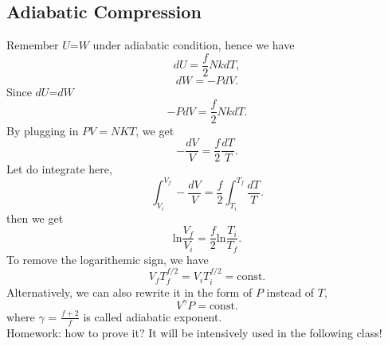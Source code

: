 \documentclass[twoside]{article}
\begin{document}
\subsection{Adiabatic Compression}
Remember $U$=$W$ under adiabatic condition, hence we have 
\begin{equation} \label{du} dU = \frac{f}{2}NkdT, \end{equation}
\begin{equation} \label{dW} dW = -PdV. \end{equation}
Since $dU$=$dW$
\begin{equation} \label{duw1} -PdV = \frac{f}{2}NkdT. \end{equation}
By plugging in $PV = NKT$, we get
\begin{equation} \label{duw2} -\frac{dV}{V} = \frac{f}{2} \frac{dT}{T}. \end{equation}
Let do integrate here,
\begin{equation} \label{duw3} \int_{V_{i}}^{V_{f}}  -\frac{dV}{V} = \frac{f}{2} \int_{T_{i}}^{T_{f}} \frac{dT}{T}. \end{equation}
then we get
\begin{equation} \label{duw4} \textrm{ln}\frac{V_f}{V_i} = \frac{f}{2} \textrm{ln}\frac{T_i}{T_f}. \end{equation}
To remove the logarithemic sign, we have 
\begin{equation} \label{duw5} V_fT_f^{f/2} = V_iT_i^{f/2} = \textrm{const}. \end{equation}
Alternatively, we can also rewrite it in the form of $P$ instead of $T$,
\begin{equation} \label{duw6} V^{\gamma}P = \textrm{const}. \end{equation}
where ${\gamma}$ = $\frac{f+2}{f}$ is called adiabatic exponent.\\
Homework: how to prove it? It will be intensively used in the following class!

{}
\end{document}
